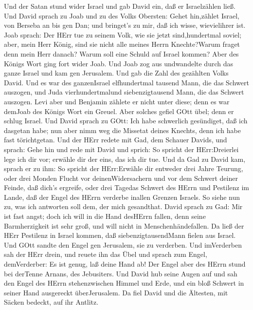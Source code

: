  Und der Satan stund wider Israel und gab David ein, daß er
Israelzählen ließ.  Und David sprach zu Joab und zu des
Volks Obersten: Gehet hin,zählet Israel, von Berseba an bis gen Dan; und
bringet's zu mir, daß ich wisse, wievielihrer ist.  Joab
sprach: Der HErr tue zu seinem Volk, wie sie jetzt sind,hundertmal
soviel; aber, mein Herr König, sind sie nicht alle meines Herrn
Knechte?Warum fraget denn mein Herr danach? Warum soll eine Schuld auf
Israel kommen?  Aber des Königs Wort ging fort wider Joab.
Und Joab zog aus undwandelte durch das ganze Israel und kam gen
Jerusalem.  Und gab die Zahl des gezählten Volks David. Und
es war des ganzenIsrael elfhundertmal tausend Mann, die das Schwert
auszogen, und Juda vierhundertmalund siebenzigtausend Mann, die das
Schwert auszogen.  Levi aber und Benjamin zählete er nicht
unter diese; denn es war demJoab des Königs Wort ein Greuel.
 Aber solches gefiel GOtt übel; denn er schlug Israel.
 Und David sprach zu GOtt: Ich habe schwerlich gesündiget,
daß ich dasgetan habe; nun aber nimm weg die Missetat deines Knechts,
denn ich habe fast törichtgetan.  Und der HErr redete mit
Gad, dem Schauer Davids, und sprach:  Gehe hin und rede mit
David und sprich: So spricht der HErr:Dreierlei lege ich dir vor;
erwähle dir der eins, das ich dir tue.  Und da Gad zu David
kam, sprach er zu ihm: So spricht der HErr:Erwähle dir 
entweder drei Jahre Teurung, oder drei Monden Flucht vor
deinenWidersachern und vor dem Schwert deiner Feinde, daß dich's
ergreife, oder drei Tagedas Schwert des HErrn und Pestilenz im Lande,
daß der Engel des HErrn verderbe inallen Grenzen Israels. So siehe nun
zu, was ich antworten soll dem, der mich gesandthat.  David
sprach zu Gad: Mir ist fast angst; doch ich will in die Hand desHErrn
fallen, denn seine Barmherzigkeit ist sehr groß, und will nicht in
Menschenhändefallen.  Da ließ der HErr Pestilenz in Israel
kommen, daß siebenzigtausendMann fielen aus Israel.  Und
GOtt sandte den Engel gen Jerusalem, sie zu verderben. Und imVerderben
sah der HErr drein, und reuete ihn das Übel und sprach zum Engel,
demVerderber: Es ist genug, laß deine Hand ab! Der Engel aber des HErrn
stund bei derTenne Arnans, des Jebusiters.  Und David hub
seine Augen auf und sah den Engel des HErrn stehenzwischen Himmel und
Erde, und ein bloß Schwert in seiner Hand ausgereckt überJerusalem. Da
fiel David und die Ältesten, mit Säcken bedeckt, auf ihr Antlitz.
